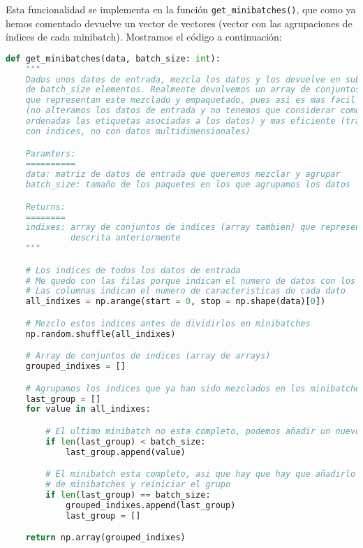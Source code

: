 \documentclass[11pt]{article}
\begin{document}
Esta funcionalidad se implementa en la función \lstinline{get_minibatches()}, que como ya hemos comentado devuelve un vector de vectores (vector con las agrupaciones de índices de cada minibatch). Mostramos el código a continuación:

\begin{lstlisting}[language=Python]
def get_minibatches(data, batch_size: int):
    """
    Dados unos datos de entrada, mezcla los datos y los devuelve en subconjuntos
    de batch_size elementos. Realmente devolvemos un array de conjuntos de indices
    que representan este mezclado y empaquetado, pues asi es mas facil de operar
    (no alteramos los datos de entrada y no tenemos que considerar como quedarian
    ordenadas las etiquetas asociadas a los datos) y mas eficiente (trabajamos
    con indices, no con datos multidimensionales)

    Paramters:
    ==========
    data: matriz de datos de entrada que queremos mezclar y agrupar
    batch_size: tamaño de los paquetes en los que agrupamos los datos

    Returns:
    ========
    indixes: array de conjuntos de indices (array tambien) que representa la operacion
             descrita anteriormente
    """

    # Los indices de todos los datos de entrada
    # Me quedo con las filas porque indican el numero de datos con los que trabajamos
    # Las columnas indican el numero de caracteristicas de cada dato
    all_indixes = np.arange(start = 0, stop = np.shape(data)[0])

    # Mezclo estos indices antes de dividirlos en minibatches
    np.random.shuffle(all_indixes)

    # Array de conjuntos de indices (array de arrays)
    grouped_indixes = []

    # Agrupamos los indices que ya han sido mezclados en los minibatches
    last_group = []
    for value in all_indixes:

        # El ultimo minibatch no esta completo, podemos añadir un nuevo punto
        if len(last_group) < batch_size:
            last_group.append(value)

        # El minibatch esta completo, asi que hay que hay que añadirlo al grupo
        # de minibatches y reiniciar el grupo
        if len(last_group) == batch_size:
            grouped_indixes.append(last_group)
            last_group = []

    return np.array(grouped_indixes)
\end{lstlisting}
\end{document}
